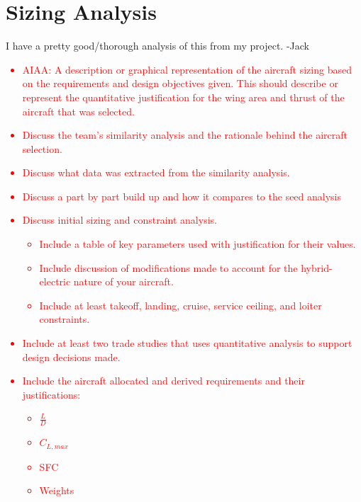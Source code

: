 \documentclass[conf]{new-aiaa}
\begin{document}
\section{Sizing Analysis}
I have a pretty good/thorough analysis of this from my project. -Jack
\textcolor{red}{\begin{itemize}
    \item AIAA: A description or graphical representation of the aircraft sizing based on the
requirements and design objectives given. This should describe or represent the
quantitative justification for the wing area and thrust of the aircraft that was selected.
    \item Discuss the team’s similarity analysis and the rationale behind the aircraft selection.
    \item Discuss what data was extracted from the similarity analysis.
    \item Discuss a part by part build up and how it compares to the seed analysis
    \item Discuss initial sizing and constraint analysis.
    \begin{itemize}
        \item Include a table of key parameters used with justification for their values.
        \item Include discussion of modifications made to account for the hybrid-electric nature of your aircraft.
        \item Include at least takeoff, landing, cruise, service ceiling, and loiter constraints.
    \end{itemize}
    \item Include at least two trade studies that uses quantitative analysis to support design decisions made.
    \item Include the aircraft allocated and derived requirements and their justifications:
    \begin{itemize}
        \item $\frac{L}{D}$
        \item $C_{L,max}$
        \item SFC
        \item Weights
    \end{itemize}
\end{itemize}}
\end{document}
